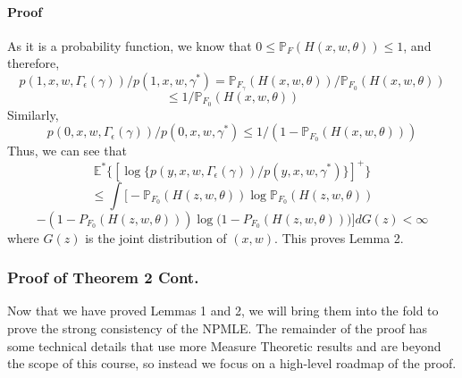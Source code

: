 \documentclass[11pt]{article}
\begin{document}
\paragraph{Proof} As it is a probability function, we know that $0\leq\mathbb P_F(H(x,w,\theta))\leq1$, and therefore,
\[
p(1,x,w,\Gamma_\epsilon (\gamma))/p(1,x,w,\gamma^*) = \mathbb P_{F_\gamma}(H(x,w,\theta))/\mathbb P_{F_0}(H(x,w,\theta))
\]
\[
\leq 1/\mathbb P_{F_0}(H(x,w,\theta))
\]
Similarly,
\[
p(0,x,w,\Gamma_\epsilon (\gamma))/p(0,x,w,\gamma^*) \leq 1/(1-\mathbb P_{F_0}(H(x,w,\theta)))
\]
Thus, we can see that
\[
\mathbb{E}^*\{[\log\{p(y,x,w,\Gamma_\epsilon (\gamma))/p(y,x,w,\gamma^*)\}]^+\}
\]
\[
\leq\int\bigg[-\mathbb P_{F_0}(H(z,w,\theta))\log\mathbb P_{F_0}(H(z,w,\theta))
\]
\[
-(1-P_{F_0}(H(z,w,\theta)))\log\mathbb (1-P_{F_0}(H(z,w,\theta)))\bigg]dG(z) <\infty
\]
where $G(z)$ is the joint distribution of $(x,w)$. This proves Lemma 2.

\subsubsection{Proof of Theorem 2 Cont.}

\indent

Now that we have proved Lemmas 1 and 2, we will bring them into the fold to prove the strong consistency of the NPMLE. The remainder of the proof has some technical details that use more Measure Theoretic results and are beyond the scope of this course, so instead we focus on a high-level roadmap of the proof. 
\end{document}
